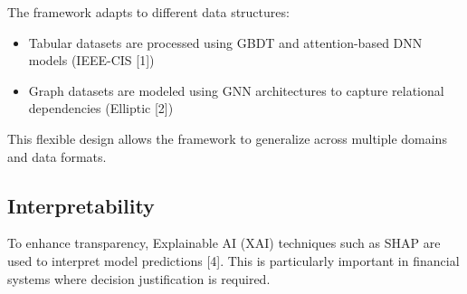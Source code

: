 \documentclass[conference]{IEEEtran}
\begin{document}
The framework adapts to different data structures:
\begin{itemize}
    \item Tabular datasets are processed using GBDT and attention-based DNN models (IEEE-CIS [1])
    \item Graph datasets are modeled using GNN architectures to capture relational dependencies (Elliptic [2])
\end{itemize}

This flexible design allows the framework to generalize across multiple domains and data formats.

\subsection{Interpretability}

To enhance transparency, Explainable AI (XAI) techniques such as SHAP are used to interpret model predictions [4]. This is particularly important in financial systems where decision justification is required.
\end{document}
